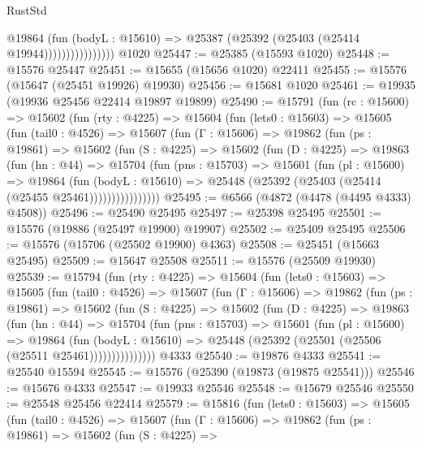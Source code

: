 \begin{lexlean}{RustStd}
\begin{coremodule}
                          @19864
                            (fun (bodyL : @15610) =>
                            @25387 (@25392 (@25403 (@25414 @19944))))))))))))))))
    @1020
@25447 := @25385 (@15593 @1020)
@25448 := @15576 @25447
@25451 := @15655 (@15656 @1020) @22411
@25455 := @15576 (@15647 (@25451 @19926) @19930)
@25456 := @15681 @1020
@25461 := @19935 (@19936 @25456 @22414 @19897 @19899)
@25490 := @15791
    (fun (rc : @15600) =>
    @15602
      (fun (rty : @4225) =>
      @15604
        (fun (lets0 : @15603) =>
        @15605
          (fun (tail0 : @4526) =>
          @15607
            (fun (Γ : @15606) =>
            @19862
              (fun (ps : @19861) =>
              @15602
                (fun (S : @4225) =>
                @15602
                  (fun (D : @4225) =>
                  @19863
                    (fun (hn : @44) =>
                    @15704
                      (fun (pns : @15703) =>
                      @15601
                        (fun (pl : @15600) =>
                        @19864
                          (fun (bodyL : @15610) =>
                          @25448 (@25392 (@25403 (@25414 (@25455 @25461))))))))))))))))
@25495 := @6566 (@4872 (@4478 (@4495 @4333) @4508))
@25496 := @25490 @25495
@25497 := @25398 @25495
@25501 := @15576 (@19886 (@25497 @19900) @19907)
@25502 := @25409 @25495
@25506 := @15576 (@15706 (@25502 @19900) @4363)
@25508 := @25451 (@15663 @25495)
@25509 := @15647 @25508
@25511 := @15576 (@25509 @19930)
@25539 := @15794
    (fun (rty : @4225) =>
    @15604
      (fun (lets0 : @15603) =>
      @15605
        (fun (tail0 : @4526) =>
        @15607
          (fun (Γ : @15606) =>
          @19862
            (fun (ps : @19861) =>
            @15602
              (fun (S : @4225) =>
              @15602
                (fun (D : @4225) =>
                @19863
                  (fun (hn : @44) =>
                  @15704
                    (fun (pns : @15703) =>
                    @15601
                      (fun (pl : @15600) =>
                      @19864
                        (fun (bodyL : @15610) =>
                        @25448 (@25392 (@25501 (@25506 (@25511 @25461)))))))))))))))
    @4333
@25540 := @19876 @4333
@25541 := @25540 @15594
@25545 := @15576 (@25390 (@19873 (@19875 @25541)))
@25546 := @15676 @4333
@25547 := @19933 @25546
@25548 := @15679 @25546
@25550 := @25548 @25456 @22414
@25579 := @15816
    (fun (lets0 : @15603) =>
    @15605
      (fun (tail0 : @4526) =>
      @15607
        (fun (Γ : @15606) =>
        @19862
          (fun (ps : @19861) =>
          @15602
            (fun (S : @4225) =>

\end{coremodule}
\end{lexlean}
